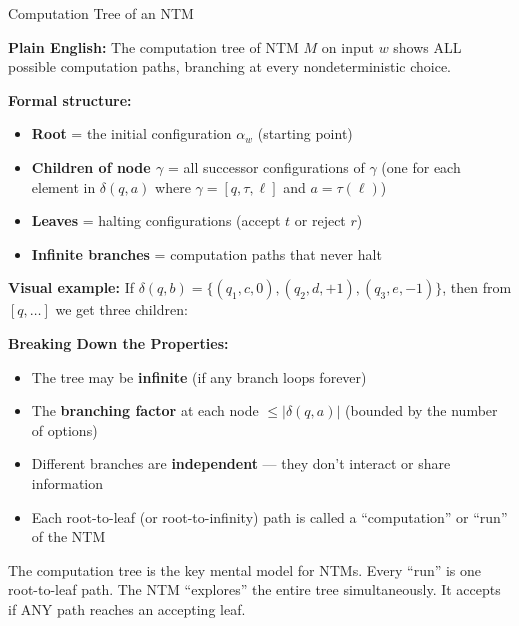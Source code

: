 \documentclass[11pt,a4paper]{article}
\newcommand{\kt}[1]{\par\vspace{0.3em}\colorbox{yellow!60}{\parbox{\dimexpr\linewidth-2\fboxsep}{#1}}\vspace{0.3em}}
\begin{document}
\begin{definitionbox}{Computation Tree of an NTM}

\textbf{Plain English:} The computation tree of NTM $M$ on input $w$ shows ALL possible computation paths, branching at every nondeterministic choice.

\textbf{Formal structure:}
\begin{itemize}[nosep]
\item \textbf{Root} = the initial configuration $\alpha_w$ (starting point)
\item \textbf{Children of node $\gamma$} = all successor configurations of $\gamma$ (one for each element in $\delta(q, a)$ where $\gamma = [q, \tau, \ell]$ and $a = \tau(\ell)$)
\item \textbf{Leaves} = halting configurations (accept $t$ or reject $r$)
\item \textbf{Infinite branches} = computation paths that never halt
\end{itemize}

\textbf{Visual example:} If $\delta(q, b) = \{(q_1, c, 0), (q_2, d, +1), (q_3, e, -1)\}$, then from $[q, \ldots]$ we get three children:

\begin{center}
\end{center}

\textbf{Breaking Down the Properties:}
\begin{itemize}[nosep]
\item The tree may be \textbf{infinite} (if any branch loops forever)
\item The \textbf{branching factor} at each node $\leq |\delta(q, a)|$ (bounded by the number of options)
\item Different branches are \textbf{independent} --- they don't interact or share information
\item Each root-to-leaf (or root-to-infinity) path is called a ``computation'' or ``run'' of the NTM
\end{itemize}

\kt{The computation tree is the key mental model for NTMs. Every ``run'' is one root-to-leaf path. The NTM ``explores'' the entire tree simultaneously. It accepts if ANY path reaches an accepting leaf.}
\end{definitionbox}
\end{document}
